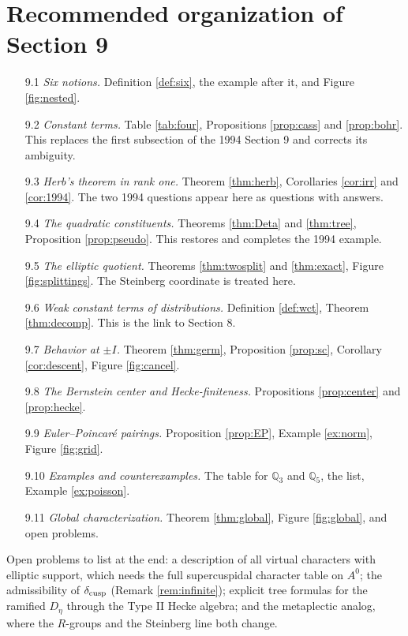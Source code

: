 \documentclass[12pt,letterpaper]{amsart}
\numberwithin{equation}{section}
\theoremstyle{definition}
\theoremstyle{remark}
\begin{document}
\section{Recommended organization of Section 9}
\begin{enumerate}[leftmargin=*]
\item[9.1] \emph{Six notions.} Definition \ref{def:six}, the example after it, and Figure \ref{fig:nested}.
\item[9.2] \emph{Constant terms.} Table \ref{tab:four}, Propositions \ref{prop:cass} and \ref{prop:bohr}. This replaces the first subsection of the 1994 Section 9 and corrects its ambiguity.
\item[9.3] \emph{Herb's theorem in rank one.} Theorem \ref{thm:herb}, Corollaries \ref{cor:irr} and \ref{cor:1994}. The two 1994 questions appear here as questions with answers.
\item[9.4] \emph{The quadratic constituents.} Theorems \ref{thm:Deta} and \ref{thm:tree}, Proposition \ref{prop:pseudo}. This restores and completes the 1994 example.
\item[9.5] \emph{The elliptic quotient.} Theorems \ref{thm:twosplit} and \ref{thm:exact}, Figure \ref{fig:splittings}. The Steinberg coordinate is treated here.
\item[9.6] \emph{Weak constant terms of distributions.} Definition \ref{def:wct}, Theorem \ref{thm:decomp}. This is the link to Section 8.
\item[9.7] \emph{Behavior at $\pm I$.} Theorem \ref{thm:germ}, Proposition \ref{prop:sc}, Corollary \ref{cor:descent}, Figure \ref{fig:cancel}.
\item[9.8] \emph{The Bernstein center and Hecke-finiteness.} Propositions \ref{prop:center} and \ref{prop:hecke}.
\item[9.9] \emph{Euler--Poincar\'e pairings.} Proposition \ref{prop:EP}, Example \ref{ex:norm}, Figure \ref{fig:grid}.
\item[9.10] \emph{Examples and counterexamples.} The table for $\mathbb Q_3$ and $\mathbb Q_5$, the list, Example \ref{ex:poisson}.
\item[9.11] \emph{Global characterization.} Theorem \ref{thm:global}, Figure \ref{fig:global}, and open problems.
\end{enumerate}
Open problems to list at the end: a description of all virtual characters with elliptic support, which needs the full supercuspidal character table on $A^0$; the admissibility of $\delta_{\rm cusp}$ (Remark \ref{rem:infinite}); explicit tree formulas for the ramified $D_\eta$ through the Type II Hecke algebra; and the metaplectic analog, where the $R$-groups and the Steinberg line both change.
\end{document}
